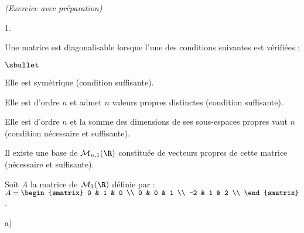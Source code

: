 \documentclass[11pt]{article}%
\begin{document}
 \begin{exercice}{\it (Exercice avec préparation)}~
 \begin{noliste}{1.}
 \setlength{\itemsep}{4mm}
 \item Une matrice est diagonalisable lorsque l'une des conditions
suivantes est vérifiées : \begin{noliste}{$\sbullet$}

 \item Elle est symétrique (condition suffisante).

 \item Elle est d'ordre $n$ et admet $n$ valeurs propres distinctes
(condition suffisante).

 \item Elle est d'ordre $n$ et la somme des dimensions de ses
sous-espaces propres vaut $n$ (condition nécessaire et suffisante).

 \item Il existe une base de $\mathcal{M}_{n,1} ( \R )$ constituée de
vecteurs propres de cette matrice (nécessaire et suffisante).

 \end{noliste}


 Soit $A$ la matrice de $\mathcal{M}_{3} (\R)$ définie par : $A =
\begin{smatrix}
0 & 1 & 0 \\
0 & 0 & 1 \\
-2 & 1 & 2 \\
\end{smatrix}
$.

 \item \begin{noliste}{a)}
 \setlength{\itemsep}{2mm}


\end{noliste}
\end{noliste}
\end{exercice}
\end{document}
